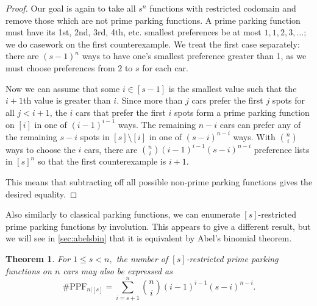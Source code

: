 \documentclass[12 pt]{amsart}
\newtheorem{theorem}{Theorem}
\theoremstyle{definition} %
\theoremstyle{remark} %
\begin{document}
\begin{proof}
	Our goal is again to take all $s^n$ functions with restricted codomain and remove those which are not prime parking functions. A prime parking function must have its 1st, 2nd, 3rd, 4th, etc. smallest preferences be at most $1,1,2,3,\ldots$; we do casework on the first counterexample. We treat the first case separately: there are $(s-1)^n$ ways to have one's smallest preference greater than 1, as we must choose preferences from $2$ to $s$ for each car.
    
    Now we can assume that some $i\in [s-1]$ is the smallest value such that the $i+1$th value is greater than $i$. Since more than $j$ cars prefer the first $j$ spots for all $j < i+1$, the $i$ cars that prefer the first $i$ spots form a prime parking function on $[i]$ in one of $(i - 1)^{i - 1}$ ways. The remaining $n - i$ cars can prefer any of the remaining $s - i$ spots in $[s] \setminus [i]$ in one of $(s - i)^{n - i}$ ways. With $\binom{n}{i}$ ways to choose the $i$ cars, there are $\binom{n}{i} (i - 1)^{i - 1} (s - i)^{n - i}$ preference lists in $[s]^{n}$ so that the first counterexample is $i+1$.

    This means that subtracting off all possible non-prime parking functions gives the desired equality.
\end{proof}

Also similarly to classical parking functions, we can enumerate $[s]$-restricted prime parking functions by involution. This appears to give a different result, but we will see in \cref{sec:abelsbin} that it is equivalent by Abel's binomial theorem.

\begin{theorem}
    \label{thm:resPPFcount2}
    For $1 \le s < n,$ the number of $[s]$-restricted prime parking functions on $n$ cars may also be expressed as
    \[\#\mathrm{PPF}_{n|[s]}=\sum_{i = s + 1}^{n} \binom{n}{i} (i - 1)^{i - 1} (s - i)^{n - i}.\]
\end{theorem}
\end{document}

